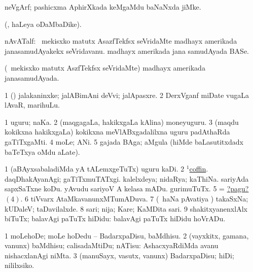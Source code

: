\bentry
{}
\gl{\nA}
\bmng
neVgArf; pashicxma AphirXkada keMgaMdu baNaNxda jiMke. 
\emng
\eentry

\bentry
{}
\gl{\saMkiSx}
\bmng
{}(\beY, haLeya oDaMbaDike). 
\emng
\eentry

\bentry
{}
\gl{\nA}
\bmng
nAvATalf: 
\banum
{} \da\ mekisxko matutx AsazfTekfsx seVridaMte madhayx amerikada janasamudAyakekx seVridavanu. 
 madhayx amerikada jana samudAyada BASe. 
\eanum
\emng
\eentry

\bentry
{}
\gl{\gu}
\bmng
(\da\ mekisxko matutx AszfTekfsx seVridaMte) madhayx amerikada janasamudAyada. 
\emng
\eentry

\bentry
{}
\gl{\nA}
\bmng
\bnum
\num{1} (\pu) jalakaninxke; jalABimAni deVvi; jalApasxre. 
\num{2} DerxVganf miDate \mo vugaLa lAvaR, marihuLu. 
\enum
\emng
\eentry

\bentry
{}
\gl{\nA}
\bmng
\bnum
\num{1} uguru; naKa. 
\num{2} (maqgagaLa, hakikxgaLa kAlina) moneyuguru. 
\num{3} (maqdu kokikxna hakikxgaLa) kokikxna meVlABxgadalilxna uguru padAthaRda gaTiTxgaMti. 
\num{4} moLe; ANi. 
\num{5} gajada  BAga; \eng{$2\frac\bg 1\eg \bg 4\eg$} aMgula (hiMde baLasutitxdadx baTeTxya oMdu aLate). 
\enum
\emng

\noindent
\gl{\pagu}
\bmng
\bnum
\num{1}  (aBAyxsabaladiMda yA tALemxgeTuTx) uguru kaDi. 
\num{2}  \hyperref{kandict_c.pdf}{C}{coffin(1)nuga}{$^1$coffin}. 
  
\banum
{} daqDhakAyanAgi; gaTiTxmuTATxgi. 
 kalelxdeya; nidaRya; kaThiNa. 
\hypertarget{nailpagu4}{} 
\eanum
\numie
{}  
\banum
{} sariyAda sapxSaTxne koDu. 
 yAvudu sariyoV A kelasa mADu. 
 gurimuTuTx. 
\eanum
\numie
\num{5} = \hyperlink{nailpagu4}{?pagu?\((4)\)}. 
\num{6}  tiVvarx AtaMkavanunxMTumADuva. 
\num{7}  (\kanmu\ haNa pAvatiya \vi) takaSxNa; kUDaleV; taDavilalxde. 
\num{8}  sari; nija; Kare; KaMDita sari. 
\num{9}  shakitxyanenxlAlx biTuTx; balavAgi paTuTx hiDidu:  balavAgi paTuTx hiDidu hoVrADu. 
\enum
\emng
\eentry

\bentry
{}
\gl{\sakirx}
\bmng
\bnum
\num{1} moLehoDe; moLe hoDedu -- BadarxpaDisu, baMdhisu. 
\num{2} (vayxkitx, gamana, \mo vanunx) baMdhisu; calisadaMtiDu; nATisu:  AshacxyaRdiMda avanu nishacxlanAgi niMta. 
\num{3} (manuSayx, vasutx, \mo vanunx) BadarxpaDisu; hiDi; nililxsiko. 
\enum
\emng

